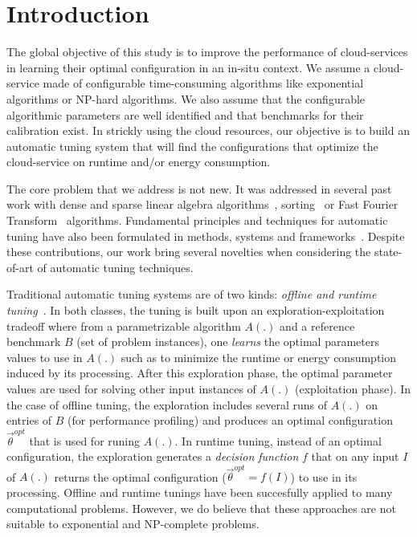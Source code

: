\documentclass[10pt, conference, compsocconf]{IEEEtran}
\begin{document}
\section{Introduction}

The global objective of this study is to improve the performance of cloud-services in learning their optimal
configuration in an  in-situ context. We assume a  cloud-service  made of configurable
time-consuming algorithms like exponential algorithms or  NP-hard algorithms. We also
assume that the configurable algorithmic parameters are well identified and that benchmarks for their calibration exist.
In strickly using the cloud resources, our objective is to build an automatic tuning system that will find
the configurations that optimize the cloud-service on runtime and/or energy consumption.

The core problem that we address is not new. It was addressed in several past work with
dense and sparse linear algebra algorithms~\cite{ATLAS,Spiral}, sorting~\cite{Spiral} or Fast Fourier Transform~\cite{FFTW}
algorithms. Fundamental principles and techniques for automatic tuning have also been formulated in methods,
systems and frameworks~\cite{Rice,Tapus:2002:AHT:762761.762771,ansel:cases:2012}. Despite these contributions, our work bring
several novelties when considering the state-of-art of automatic tuning techniques.

Traditional automatic tuning systems are of two kinds: {\it offline and runtime tuning}~\cite{Tichy:2014:APS:2636925.2636340}.
In both classes, the tuning is built upon an exploration-exploitation tradeoff where from a parametrizable algorithm $A(.)$
and a reference benchmark $B$ (set of problem instances), one {\it learns} the optimal parameters values to use in $A(.)$
such as to  minimize the runtime or energy consumption induced by its processing.
After this exploration phase, the optimal parameter values are used for solving other input instances of $A(.)$ (exploitation phase).
In the case of offline tuning, the exploration includes several runs of $A(.)$ on entries of $B$ (for performance profiling)
and produces an optimal configuration $\vec{\theta}^{opt}$ that is used for runing $A(.)$.
In runtime tuning, instead of an optimal configuration, the exploration generates a {\it decision function} $f$
that on any input $I$ of $A(.)$ returns the optimal configuration ($\vec{\theta}^{opt} = f(I)$) to use in its processing.
Offline and runtime tunings have been succesfully applied to many computational problems. However, we do believe that
these approaches are not suitable to exponential and NP-complete problems.
\end{document}
